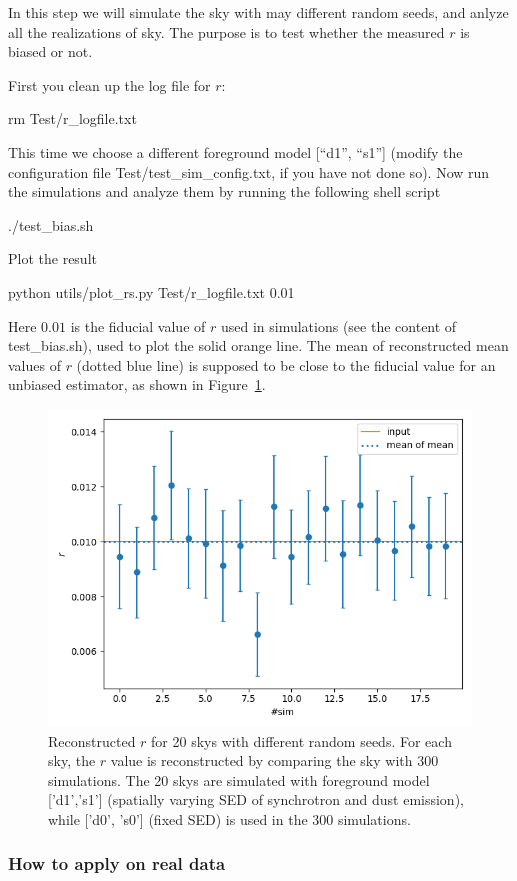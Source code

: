 \documentclass[12pt, a4paper]{ctexart} %
\def\tbox#1{\begin{tcolorbox}#1\end{tcolorbox}}
\begin{document}
In this step we will simulate the sky with may different random seeds, and anlyze all the realizations of sky. The purpose is to test whether the measured $r$ is biased or not.

First you clean up the log file for $r$:
\tbox{rm Test/r\_logfile.txt}
This time we choose a different foreground model [``d1'', ``s1''] (modify the configuration file Test/test\_sim\_config.txt, if you have not done so). Now run the simulations and analyze them by running the following shell script
\tbox{./test\_bias.sh}
Plot the result
\tbox{python utils/plot\_rs.py Test/r\_logfile.txt 0.01}
Here $0.01$ is the fiducial value of $r$ used in simulations (see the content of test\_bias.sh), used to plot the solid orange line. The mean of reconstructed mean values of $r$ (dotted blue line) is supposed to be close to the fiducial value for an unbiased estimator, as shown in Figure~\ref{fig:r_logs}.
\begin{figure}
  \includegraphics[width=\textwidth]{r_logs.png}
  \caption{Reconstructed $r$ for 20 skys with different random seeds. For each sky, the $r$ value is reconstructed by comparing the sky with 300 simulations. The 20 skys are simulated with foreground model ['d1','s1'] (spatially varying SED of synchrotron and dust emission), while  ['d0', 's0'] (fixed SED) is used in the 300 simulations. \label{fig:r_logs}}
\end{figure}


\subsubsection{How to apply on real data}
\end{document}
